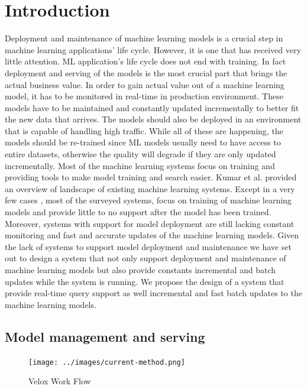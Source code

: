 \documentclass{sig-alternate-05-2015}
\begin{document}
\section{Introduction}
Deployment and maintenance of machine learning models is a crucial step in machine learning applications' life cycle. 
However, it is one that has received very little attention. 
ML application's life cycle does not end with training. 
In fact deployment and serving of the models is the most crucial part that brings the actual business value. 
In order to gain actual value out of a machine learning model, it has to be monitored in real-time in production environment. 
These models have to be maintained and constantly updated incrementally to better fit the new data that arrives. 
The models should also be deployed in an environment that is capable of handling high traffic. 
While all of these are happening, the models should be re-trained since ML models usually need to have access to entire datasets, otherwise the quality will degrade if they are only updated incrementally.
Most of the machine learning systems focus on training and providing tools to make model training and search easier. 
Kumar et al. \cite{kumar2015survey} provided an overview of landscape of existing machine learning systems. 
Except in a very few cases \cite{akdere2011case, crankshaw2014missing}, most of the surveyed systems, focus on training of machine learning models and provide little to no support after the model has been trained.
Moreover, systems with support for model deployment are still lacking constant monitoring and fast and accurate updates of the machine learning models.
Given the lack of systems to support model deployment and maintenance we have set out to design a system that not only support deployment and maintenance of machine learning models but also provide constants incremental and batch updates while the system is running. 
We propose the design of a system that provide real-time query support as well incremental and fast batch updates to the machine learning models.

\subsection{Model management and serving} \label{model-management-serving}

\begin{figure}[t]
\centering
\texttt{[image: ../images/current-method.png]}
\caption{Velox Work Flow}
\label{fig:velox-work-flow}
\end{figure}
\end{document}
